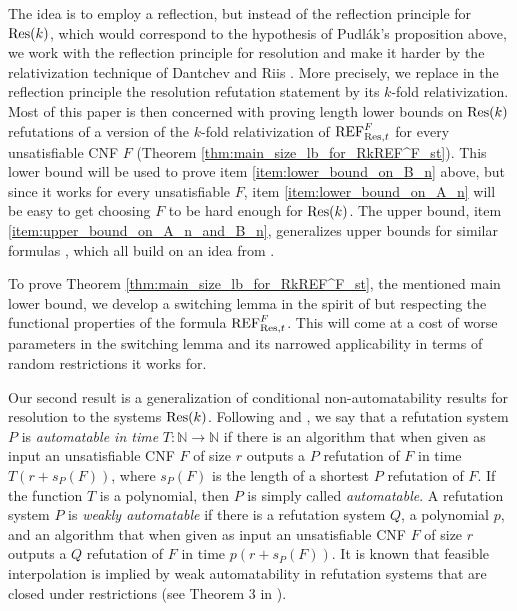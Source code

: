 The idea is to employ a reflection, but instead of the reflection principle for $\textnormal{Res}(k)$, which would correspond to the hypothesis of Pudl\'ak's proposition above, we work with the reflection principle for resolution and make it harder by the relativization technique of Dantchev and Riis \cite{Dantchev-Riis2003}. More precisely, we replace in the reflection principle the resolution refutation statement by its $k$-fold relativization. Most of this paper is then concerned with proving length lower bounds on $\textnormal{Res}(k)$ refutations of a version of the $k$-fold relativization of $\textnormal{REF}^F_{\textnormal{Res},t}$ for every unsatisfiable CNF $F$ (Theorem \ref{thm:main_size_lb_for_RkREF^F_st}). This lower bound will be used to prove item \ref{item:lower_bound_on_B_n} above, but since it works for every unsatisfiable $F$, item \ref{item:lower_bound_on_A_n} will be easy to get choosing $F$ to be hard enough for $\textnormal{Res}(k)$. The upper bound, item \ref{item:upper_bound_on_A_n_and_B_n}, generalizes upper bounds for similar formulas \cite{Atserias-Bonet2004, atserias-muller2019-focs, Garlik2019-mfcs}, which all build on an idea from \cite{Pudlak2003}.

To prove Theorem \ref{thm:main_size_lb_for_RkREF^F_st}, the mentioned main lower bound, we develop a switching lemma in the spirit of \cite{segerlind-buss-impagliazzo} but respecting the functional properties of the formula $\textnormal{REF}^F_{\textnormal{Res},t}$. This will come at a cost of worse parameters in the switching lemma and its narrowed applicability in terms of random restrictions it works for.

Our second result is a generalization of conditional non-automatability results for resolution \cite{atserias-muller2019-focs} to the systems $\textnormal{Res}(k)$. Following \cite{Bonet-Pitassi-Raz,Atserias-Bonet2004} and \cite{atserias-muller2019-focs}, we say that a refutation system $P$ is \emph{automatable in time} $T: \mathbb{N} \rightarrow \mathbb{N}$ if there is an algorithm that when given as input an unsatisfiable CNF $F$ of size $r$ outputs a $P$ refutation of $F$ in time $T(r + s_P(F))$, where $s_P(F)$ is the length of a shortest $P$ refutation of $F$. If the function $T$ is a polynomial, then $P$ is simply called \emph{automatable}. A refutation system $P$ is \emph{weakly automatable} if there is a refutation system $Q$, a polynomial $p$, and an algorithm that when given as input an unsatisfiable CNF $F$ of size $r$ outputs a $Q$ refutation of $F$ in time $p(r+s_P(F))$. It is known that feasible interpolation is implied by weak automatability in refutation systems that are closed under restrictions (see Theorem 3 in \cite{Atserias-Bonet2004}).

